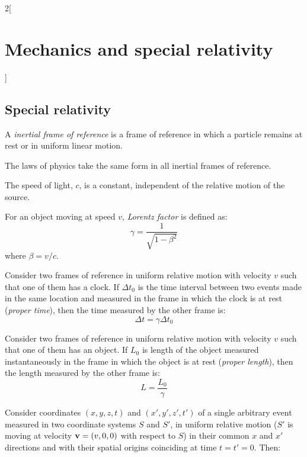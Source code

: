 \documentclass[../../../main.tex]{subfiles}
\begin{document}
\begin{multicols}{2}[\section{Mechanics and special relativity}]
  \subsection{Special relativity}
  \begin{definition}
    A \emph{inertial frame of reference} is a frame of reference in which a particle remains at rest or in uniform linear motion.
  \end{definition}
  \begin{principle}
    The laws of physics take the same form in all inertial frames of reference.
  \end{principle}
  \begin{principle}
    The speed of light, $c$, is a constant, independent of the relative motion of the source.
  \end{principle}
  \begin{definition}
    For an object moving at speed $v$, \emph{Lorentz factor} is defined as:
    $$\gamma=\frac{1}{\sqrt{1-\beta^2}}$$ where $\beta=v/c$.
  \end{definition}
  \begin{proposition}
    Consider two frames of reference in uniform relative motion with velocity $v$ such that one of them has a clock. If $\Delta t_0$ is the time interval between two events made in the same location and measured in the frame in which the clock is at rest (\emph{proper time}), then the time measured by the other frame is:
    $$\Delta t=\gamma\Delta t_0$$
  \end{proposition}
  \begin{proposition}
    Consider two frames of reference in uniform relative motion with velocity $v$ such that one of them has an object. If $L_0$ is length of the object measured instantaneously in the frame in which the object is at rest (\emph{proper length}), then the length measured by the other frame is:
    $$L=\frac{L_0}{\gamma}$$
  \end{proposition}
  \begin{proposition}
    Consider coordinates $(x,y,z,t)$ and $(x',y',z',t')$ of a single arbitrary event measured in two coordinate systems $S$ and $S'$, in uniform relative motion ($S'$ is moving at velocity $\boldsymbol{\mathrm{v}}=(v,0,0)$ with respect to $S$) in their common $x$ and $x'$ directions and  with their spatial origins coinciding at time $t=t'=0$. Then:
    \begin{align*}

\end{align*}
\end{proposition}
\end{multicols}
\end{document}
